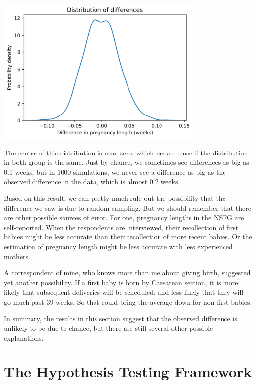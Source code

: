 \begin{center}
\includegraphics[width=4in]{13_hypothesis_files/13_hypothesis_66_0.png}
\end{center}

The center of this distribution is near zero, which makes sense if the
distribution in both group is the same. Just by chance, we sometimes see
differences as big as 0.1 weeks, but in 1000 simulations, we never see a
difference as big as the observed difference in the data, which is
almost 0.2 weeks.

Based on this result, we can pretty much rule out the possibility that
the difference we saw is due to random sampling. But we should remember
that there are other possible sources of error. For one, pregnancy
lengths in the NSFG are self-reported. When the respondents are
interviewed, their recollection of first babies might be less accurate
than their recollection of more recent babies. Or the estimation of
pregnancy length might be less accurate with less experienced mothers.

A correspondent of mine, who knows more than me about giving birth,
suggested yet another possibility. If a first baby is born by
\href{https://en.wikipedia.org/wiki/Caesarean_section}{Caesarean
section}, it is more likely that subsequent deliveries will be
scheduled, and less likely that they will go much past 39 weeks. So that
could bring the average down for non-first babies.

In summary, the results in this section suggest that the observed
difference is unlikely to be due to chance, but there are still several
other possible explanations.

\hypertarget{the-hypothesis-testing-framework}{%
\section{The Hypothesis Testing
Framework}\label{the-hypothesis-testing-framework}}

